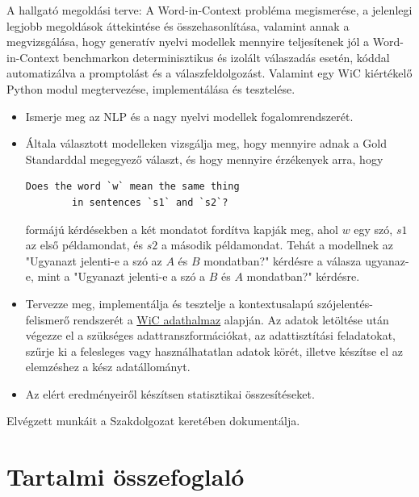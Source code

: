 \documentclass[12pt]{report}
\theoremstyle{definition}
\begin{document}
A hallgató megoldási terve:
A Word-in-Context probléma megismerése, a jelenlegi legjobb megoldások áttekintése és összehasonlítása, valamint annak a megvizsgálása, hogy generatív nyelvi modellek mennyire teljesítenek jól a Word-in-Context benchmarkon determinisztikus és izolált válaszadás esetén, kóddal automatizálva a promptolást és a válaszfeldolgozást. Valamint egy WiC kiértékelő Python modul megtervezése, implementálása és tesztelése.
\begin{itemize}
	\item Ismerje meg az NLP és a nagy nyelvi modellek fogalomrendszerét.
	\item Általa választott modelleken vizsgálja meg, hogy mennyire adnak a Gold Standarddal megegyező választ, és hogy mennyire érzékenyek arra, hogy
	      \begin{verbatim}Does the word `w` mean the same thing
        in sentences `s1` and `s2`?\end{verbatim}
	      formájú kérdésekben a két mondatot fordítva kapják meg, ahol $w$ egy szó, $s1$ az első példamondat, és $s2$ a második példamondat. Tehát a modellnek az "Ugyanazt jelenti-e a szó az $A$ és $B$ mondatban?" kérdésre a válasza ugyanaz-e, mint a "Ugyanazt jelenti-e a szó a $B$ és $A$ mondatban?" kérdésre.
	\item Tervezze meg, implementálja és tesztelje a kontextusalapú szójelentés-felismerő rendszerét a \href{https://pilehvar.github.io/wic/}{WiC adathalmaz} alapján. Az adatok letöltése után végezze el a szükséges adattranszformációkat, az adattisztítási feladatokat, szűrje ki a felesleges vagy használhatatlan adatok körét, illetve készítse el az elemzéshez a kész adatállományt.
	\item Az elért eredményeiről készítsen statisztikai összesítéseket.
\end{itemize}
Elvégzett munkáit a Szakdolgozat keretében dokumentálja.

\clearpage

\chapter*{Tartalmi összefoglaló}
\end{document}
